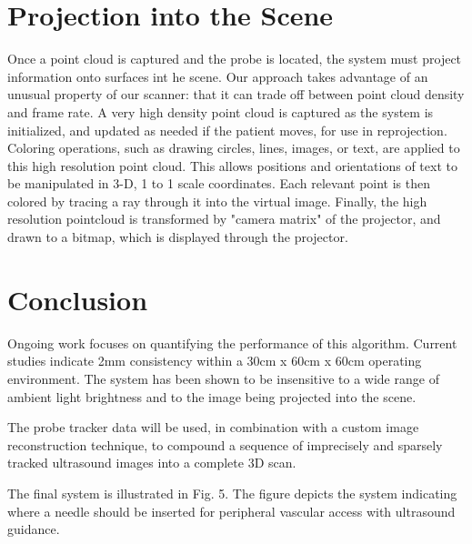 \documentclass{llncs}
\begin{document}
\section{Projection into the Scene}

Once a point cloud is captured and the probe is located, the system must project information onto surfaces int he scene. Our approach takes advantage of an unusual property of our scanner: that it can trade off between point cloud density and frame rate. A very high density point cloud is captured as the system is initialized, and updated as needed if the patient moves, for use in reprojection. Coloring operations, such as drawing circles, lines, images, or text, are applied to this high resolution point cloud. This allows positions and orientations of text to be manipulated in 3-D, 1 to 1 scale coordinates. Each relevant point is then colored by tracing a ray through it into the virtual image. Finally, the high resolution pointcloud is transformed by "camera matrix" of the projector, and drawn to a bitmap, which is displayed through the projector. 

\section{Conclusion}
Ongoing work focuses on quantifying the performance of this algorithm.  Current studies indicate 2mm consistency within a 30cm x 60cm x 60cm operating environment.  The system has been shown to be insensitive to a wide range of ambient light brightness and to the image being projected into the scene.

The probe tracker data will be used, in combination with a custom image reconstruction technique, to compound a sequence of imprecisely and sparsely tracked ultrasound images into a complete 3D scan.


The final system is illustrated in Fig. 5.  The figure depicts the system indicating where a needle should be inserted for peripheral vascular access with ultrasound guidance.
\end{document}
